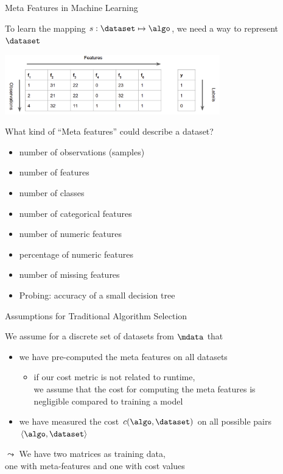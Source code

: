 \begin{frame}[c]{Meta Features in Machine Learning}

To learn the mapping $s: \dataset \mapsto \algo$, we need a way to represent $\dataset$

\begin{center}
	\includegraphics[width=0.7\textwidth]{images/ml_data}
\end{center}


What kind of ``Meta features'' could describe a dataset? \hands

\pause
\begin{itemize}
	\item number of observations (samples)
	\item number of features
	\item number of classes
	\item number of categorical features
	\item number of numeric features
	\item percentage of numeric features
	\item number of missing features
	\item Probing: accuracy of a small decision tree
\end{itemize}


\end{frame}
\begin{frame}[c]{Assumptions for Traditional Algorithm Selection}

We assume for a discrete set of datasets from $\mdata$ that
\begin{itemize}
	\item we have pre-computed the meta features on all datasets
	\pause
	\begin{itemize}
		\item if our cost metric is not related to runtime,\\
		we assume that the cost for computing the meta features is\\ negligible compared to training a model
	\end{itemize}
	\pause
	\item we have measured the cost $c(\algo, \dataset)$ on all possible pairs $\langle \algo, \dataset\rangle$
\end{itemize}

\pause
\medskip

$\leadsto$ We have two matrices as training data,\\ one with meta-features and one with cost values

\end{frame}
